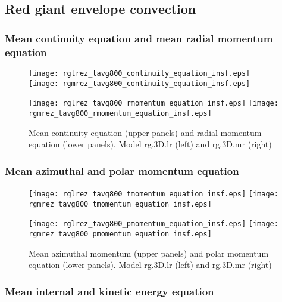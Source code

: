 \documentclass[10pt,paper=a4]{report}
\begin{document}
\newpage

\subsection{Red giant envelope convection}

\subsubsection{Mean continuity equation and mean radial momentum equation}

\begin{figure}[!h]
\centerline{
\texttt{[image: rglrez\_tavg800\_continuity\_equation\_insf.eps]}
\texttt{[image: rgmrez\_tavg800\_continuity\_equation\_insf.eps]}}

\centerline{
\texttt{[image: rglrez\_tavg800\_rmomentum\_equation\_insf.eps]}
\texttt{[image: rgmrez\_tavg800\_rmomentum\_equation\_insf.eps]}}
\caption{Mean continuity equation (upper panels) and radial momentum equation (lower panels). Model {\sf rg.3D.lr} (left) and {\sf rg.3D.mr} (right) \label{fig:rg-res-cont-rmomentum-equation}}
\end{figure}


\newpage

\subsubsection{Mean azimuthal and polar momentum equation}

\begin{figure}[!h]
\centerline{
\texttt{[image: rglrez\_tavg800\_tmomentum\_equation\_insf.eps]}
\texttt{[image: rgmrez\_tavg800\_tmomentum\_equation\_insf.eps]}}

\centerline{
\texttt{[image: rglrez\_tavg800\_pmomentum\_equation\_insf.eps]}
\texttt{[image: rgmrez\_tavg800\_pmomentum\_equation\_insf.eps]}}
\caption{Mean azimuthal momentum (upper panels) and polar momentum equation (lower panels). Model {\sf rg.3D.lr} (left) and {\sf rg.3D.mr} (right) \label{fig:rg-res-rmomentum-tmomentum-equation}}
\end{figure}

\newpage

\subsubsection{Mean internal and kinetic energy equation}
\end{document}

